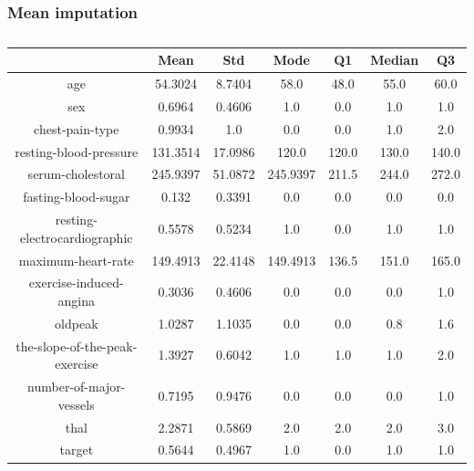 \documentclass{classrep}
\begin{document}
{{{            }

            \subsubsection{Mean imputation}
            \label{results:5-percent:mean-input} {

                \begin{table}[!htbp]
                    \centering
                    \begin{tabular}{|c|c|c|c|c|c|c|}
                        \hline
                        & Mean & Std & Mode & Q1 & Median & Q3 \\ \hline
                        age & 54.3024 & 8.7404 & 58.0 & 48.0 & 55.0 & 60.0 \\ \hline
                        sex & 0.6964 & 0.4606 & 1.0 & 0.0 & 1.0 & 1.0 \\ \hline
                        chest-pain-type & 0.9934 & 1.0 & 0.0 & 0.0 & 1.0 & 2.0 \\ \hline
                        resting-blood-pressure & 131.3514 & 17.0986 & 120.0 & 120.0 & 130.0 & 140.0 \\ \hline
                        serum-cholestoral & 245.9397 & 51.0872 & 245.9397 & 211.5 & 244.0 & 272.0 \\ \hline
                        fasting-blood-sugar & 0.132 & 0.3391 & 0.0 & 0.0 & 0.0 & 0.0 \\ \hline
                        resting-electrocardiographic & 0.5578 & 0.5234 & 1.0 & 0.0 & 1.0 & 1.0 \\ \hline
                        maximum-heart-rate & 149.4913 & 22.4148 & 149.4913 & 136.5 & 151.0 & 165.0 \\ \hline
                        exercise-induced-angina & 0.3036 & 0.4606 & 0.0 & 0.0 & 0.0 & 1.0 \\ \hline
                        oldpeak & 1.0287 & 1.1035 & 0.0 & 0.0 & 0.8 & 1.6 \\ \hline
                        the-slope-of-the-peak-exercise & 1.3927 & 0.6042 & 1.0 & 1.0 & 1.0 & 2.0 \\ \hline
                        number-of-major-vessels & 0.7195 & 0.9476 & 0.0 & 0.0 & 0.0 & 1.0 \\ \hline
                        thal & 2.2871 & 0.5869 & 2.0 & 2.0 & 2.0 & 3.0 \\ \hline
                        target & 0.5644 & 0.4967 & 1.0 & 0.0 & 1.0 & 1.0 \\ \hline
                    \end{tabular}
                    \caption{}
                    \label{result_5_Mean-imputation}
                \end{table}
                \FloatBarrier

}}}
\end{document}
